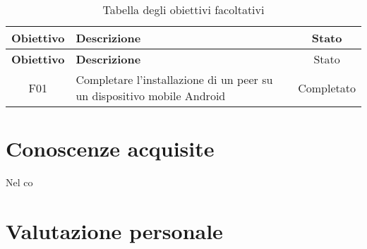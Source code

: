 \begin{center}
	\begin{longtable}{| c | p{23em} | c |}
		\caption{Tabella degli obiettivi facoltativi}
		\label{tab:obiettivi-facoltativi}\\
		\hline
		\textbf{Obiettivo} & \centering\textbf{Descrizione} & Stato\\
		\endfirsthead
		\hline
		\textbf{Obiettivo} & \centering\textbf{Descrizione} & Stato\\
		\endhead
		\endfoot
		
		\hline
		F01    & Completare l'installazione di un peer su un dispositivo mobile Android & Completato\\
		\hline
	\end{longtable}
\end{center}

\section{Conoscenze acquisite}
Nel co

\section{Valutazione personale}
